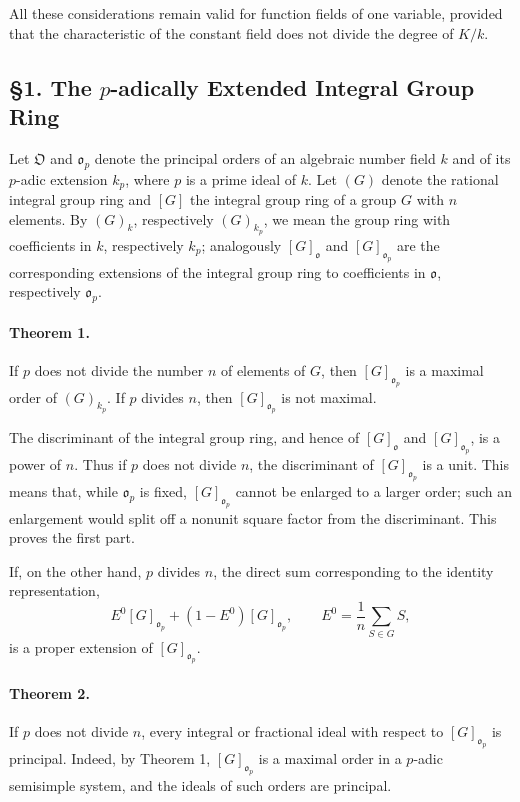\documentclass[11pt]{article}
\providecommand{\frako}{\mathfrak o}
\providecommand{\frako}{\mathfrak o}
\providecommand{\frakO}{\mathfrak O}
\begin{document}
All these considerations remain valid for function fields of one variable, provided that the characteristic of the constant field does not divide the degree of \(K/k\).

\subsection*{§1. The \(p\)-adically Extended Integral Group Ring}

Let \(\frakO\) and \(\frako_p\) denote the principal orders of an algebraic number field \(k\) and of its \(p\)-adic extension \(k_p\), where \(p\) is a prime ideal of \(k\). Let \((G)\) denote the rational integral group ring and \([G]\) the integral group ring of a group \(G\) with \(n\) elements. By \((G)_k\), respectively \((G)_{k_p}\), we mean the group ring with coefficients in \(k\), respectively \(k_p\); analogously \([G]_{\frako}\) and \([G]_{\frako_p}\) are the corresponding extensions of the integral group ring to coefficients in \(\frako\), respectively \(\frako_p\).

\paragraph{Theorem 1.}
If \(p\) does not divide the number \(n\) of elements of \(G\), then \([G]_{\frako_p}\) is a maximal order of \((G)_{k_p}\). If \(p\) divides \(n\), then \([G]_{\frako_p}\) is not maximal.

The discriminant of the integral group ring, and hence of \([G]_{\frako}\) and \([G]_{\frako_p}\), is a power of \(n\). Thus if \(p\) does not divide \(n\), the discriminant of \([G]_{\frako_p}\) is a unit. This means that, while \(\frako_p\) is fixed, \([G]_{\frako_p}\) cannot be enlarged to a larger order; such an enlargement would split off a nonunit square factor from the discriminant. This proves the first part.

If, on the other hand, \(p\) divides \(n\), the direct sum corresponding to the identity representation,
\[
        E^0 [G]_{\frako_p}+(1-E^0)[G]_{\frako_p},
        \qquad
        E^0=\frac1n\sum_{S\in G}S,
\]
is a proper extension of \([G]_{\frako_p}\).

\paragraph{Theorem 2.}
If \(p\) does not divide \(n\), every integral or fractional ideal with respect to \([G]_{\frako_p}\) is principal. Indeed, by Theorem 1, \([G]_{\frako_p}\) is a maximal order in a \(p\)-adic semisimple system, and the ideals of such orders are principal.
\end{document}
